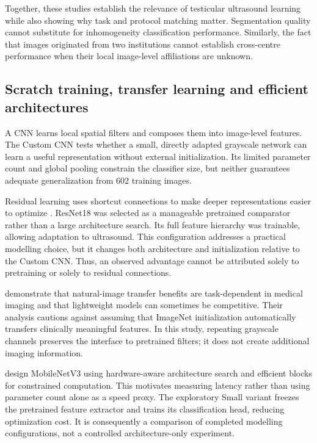 \documentclass[11pt,a4paper]{article}
\begin{document}
Together, these studies establish the relevance of testicular ultrasound learning while also showing why task and protocol matching matter. Segmentation quality cannot substitute for inhomogeneity classification performance. Similarly, the fact that images originated from two institutions cannot establish cross-centre performance when their local image-level affiliations are unknown.

\subsection{Scratch training, transfer learning and efficient architectures}
A CNN learns local spatial filters and composes them into image-level features. The Custom CNN tests whether a small, directly adapted grayscale network can learn a useful representation without external initialization. Its limited parameter count and global pooling constrain the classifier size, but neither guarantees adequate generalization from 602 training images.

Residual learning uses shortcut connections to make deeper representations easier to optimize \citep{he2016}. ResNet18 was selected as a manageable pretrained comparator rather than a large architecture search. Its full feature hierarchy was trainable, allowing adaptation to ultrasound. This configuration addresses a practical modelling choice, but it changes both architecture and initialization relative to the Custom CNN. Thus, an observed advantage cannot be attributed solely to pretraining or solely to residual connections.

\citet{raghu2019} demonstrate that natural-image transfer benefits are task-dependent in medical imaging and that lightweight models can sometimes be competitive. Their analysis cautions against assuming that ImageNet initialization automatically transfers clinically meaningful features. In this study, repeating grayscale channels preserves the interface to pretrained filters; it does not create additional imaging information.

\citet{howard2019} design MobileNetV3 using hardware-aware architecture search and efficient blocks for constrained computation. This motivates measuring latency rather than using parameter count alone as a speed proxy. The exploratory Small variant freezes the pretrained feature extractor and trains its classification head, reducing optimization cost. It is consequently a comparison of completed modelling configurations, not a controlled architecture-only experiment.
\end{document}
